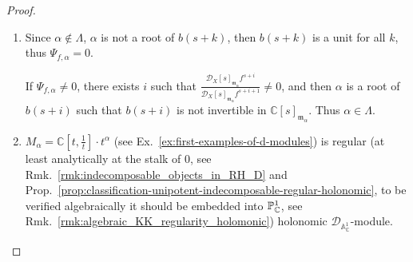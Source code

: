 \begin{proof}
\begin{enumerate}
              When localizing at $\mathfrak{m}_{\alpha}$,
              a polynomial $g(s)$ becomes invertible if $g(\alpha) \neq 0$.
              Under the shift, the action of $g(s)$ becomes the action of $g(s-1)$, evaluated at $s = \alpha+1$ is also non-zero, making it invertible in $\mathbb{C}[s]_{\mathfrak{m}_{\alpha+1}}$.
              So we can safely define the map below:
              \begin{align*}
                  T_{-1}: \mathcal{D}_{X}[s]_{\mathfrak{m}_{\alpha}}f^{s-k} & \stackrel{\sim}{\longrightarrow} \mathcal{D}_{X}[s]_{\mathfrak{m}_{\alpha+1}}f^{s-k-1} \\
                  \frac{m}{g(s)}                                            & \longmapsto \frac{T_{-1}(m)}{g(s-1)}
              \end{align*}
              for any integer $k$. And one should verify that it is indeed an isomorphism.

              For $k \gg 0$, the sequence of modules stabilizes. Passing to the respective quotients, this induces the desired $\mathcal{D}_X$-module isomorphism $\Psi_{f,\alpha} \xrightarrow{\sim} \Psi_{f,\alpha+1}$.

        \item Since $\alpha \not\in\Lambda$, $\alpha$ is not a root of $b(s+k)$, then $b(s+k)$ is a unit for all $k$, thus $\Psi_{f,\alpha}=0$.

              If $\Psi_{f,\alpha}\neq 0$,
              there exists $i$ such that $\frac{\mathcal{D}_{X}[s]_{\mathfrak{m}_{\alpha}}f^{s+i}}{\mathcal{D}_{X}[s]_{\mathfrak{m}_{\alpha}}f^{s+i+1}}\neq 0$,
              and then $\alpha$ is a root of $b(s+i)$ such that $b(s+i)$ is not invertible in $\mathbb{C}[s]_{\mathfrak{m}_{\alpha}}$. Thus $\alpha\in\Lambda$.

        \item $M_{\alpha} = \mathbb{C}[t, \frac{1}{t}] \cdot t^{\alpha}$ (see Ex.~\ref{ex:first-examples-of-d-modules}) is regular
              (at least analytically at the stalk of $0$, see Rmk.~\ref{rmk:indecomposable_objects_in_RH_D} and Prop.~\ref{prop:classification-unipotent-indecomposable-regular-holonomic},
              to be verified algebraically it should be embedded into $\mathbb{P}^1_{\mathbb{C}}$, see Rmk.~\ref{rmk:algebraic_KK_regularity_holomonic})
              holonomic $\mathcal{D}_{\mathbb{A}^{1}_{\mathbb{C}}}$-module.


\end{enumerate}
\end{proof}
